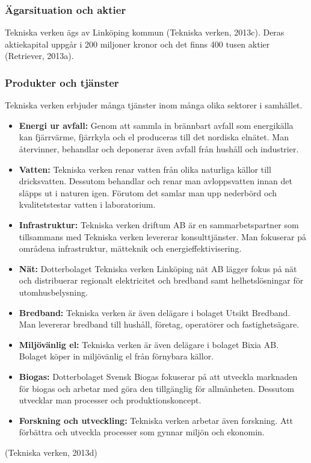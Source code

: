 \documentclass[10pt,a4paper]{article}
\begin{document}
\subsubsection{Ägarsituation och aktier}
Tekniska verken ägs av Linköping kommun (Tekniska verken, 2013c). Deras
aktiekapital uppgår i 200 miljoner kronor och det finns 400 tusen
aktier (Retriever, 2013a).

\subsubsection{Produkter och tjänster} \label{subsec:prod}
Tekniska verken erbjuder många tjänster inom många olika sektorer i samhället.
\begin{itemize}
	\item \textbf{Energi ur avfall:} Genom att sammla in brännbart avfall som energikälla kan fjärrvärme, fjärrkyla och el produceras till det nordiska elnätet. Man återvinner, behandlar och deponerar även avfall från hushåll
	och industrier.
	\item \textbf{Vatten:} Tekniska verken renar vatten från olika naturliga källor till
	dricksvatten. Dessutom behandlar och renar man avloppsvatten innan det släpps ut i naturen igen. Förutom det samlar man upp nederbörd och kvalitetstestar vatten i laboratorium.
	\item \textbf{Infrastruktur:} Tekniska verken driftum AB är en sammarbetspartner
	som tillsammans med Tekniska verken levererar konsulttjänster. Man fokuserar på områdena infrastruktur,
	mätteknik och energieffektivisering.
	\item \textbf{Nät:} Dotterbolaget Tekniska verken Linköping nät AB lägger fokus på nät och distribuerar regionalt elektricitet och bredband samt
	helhetslösningar för utomhusbelysning.
	\item \textbf{Bredband:} Tekniska verken är även delägare i bolaget Utsikt
	Bredband. Man levererar bredband till hushåll, företag, operatörer och fastighetsägare.
	\item \textbf{Miljövänlig el:} Tekniska verken är även delägare i bolaget Bixia
	AB. Bolaget köper in miljövänlig el från förnybara källor.
	\item \textbf{Biogas:} Dotterbolaget Svensk Biogas fokuserar på att utveckla
	marknaden för biogas och arbetar med göra den tillgänglig för allmänheten.
	Dessutom utvecklar man processer och produktionskoncept.
	\item \textbf{Forskning och utveckling:} Tekniska verken arbetar även forskning. Att
	förbättra och utveckla processer som gynnar miljön och ekonomin.
\end{itemize}
(Tekniska verken, 2013d)
\end{document}
